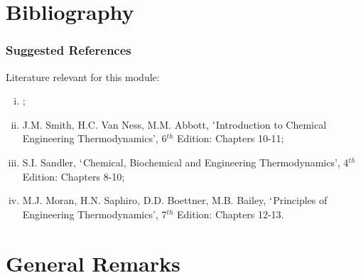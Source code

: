 \documentclass[10pt,compress,unknownkeysallowed]{beamer}
\begin{document}
\section{Bibliography}
\begin{frame}
 \frametitle{Suggested References}
  Literature relevant for this module:
  \begin{enumerate}[(i)]
   \item {};
   \item\label{SVN_Book} J.M. Smith, H.C. Van Ness, M.M. Abbott, $\lq$Introduction to Chemical Engineering Thermodynamics', 6$^{th}$ Edition: Chapters 10-11;
   \item\label{Sandle_Book} S.I. Sandler, $\lq$Chemical, Biochemical and Engineering Thermodynamics', 4$^{th}$ Edition: Chapters 8-10;
   \item M.J. Moran, H.N. Saphiro, D.D. Boettner, M.B. Bailey, $\lq$Principles of Engineering Thermodynamics', 7$^{th}$ Edition: Chapters 12-13.
  \end{enumerate}
\end{frame}



\section{General Remarks}
\end{document}
